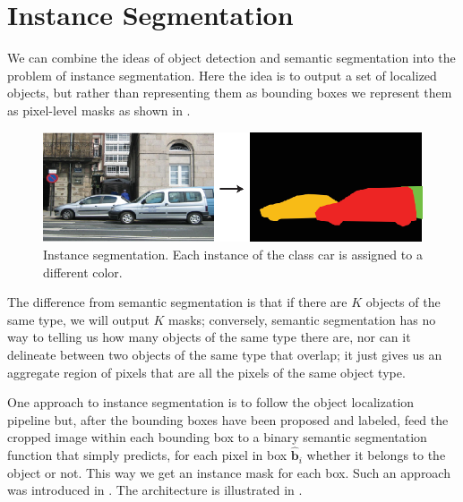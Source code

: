 \section{Instance Segmentation}

We can combine the ideas of object detection and semantic segmentation into the problem of instance segmentation. Here the idea is to output a set of localized objects, but rather than representing them as bounding boxes we represent them as pixel-level masks as shown in \fig{\ref{fig:instance_segmentation}}.


\begin{figure}
    \centerline{
        \includegraphics[width=0.6\linewidth]{figures/object_recognition/instance_segmentation.eps}
    }
    \caption{Instance segmentation. Each instance of the class car is assigned to a different color.}
    \label{fig:instance_segmentation}
\end{figure}

The difference from semantic segmentation is that if there are $K$ objects of the same type, we will output $K$ masks; conversely, semantic segmentation has no way to telling us how many objects of the same type there are, nor can it delineate between two objects of the same type that overlap; it just gives us an aggregate region of pixels that are all the pixels of the same object type.

One approach to instance segmentation is to follow the object localization pipeline but, after the bounding boxes have been proposed and labeled, feed the cropped image within each bounding box to a binary semantic segmentation function that simply predicts, for each pixel in box $\hat{\mathbf{b}}_i$ whether it belongs to the object or not. This way we get an instance mask for each box. Such an approach was introduced in \cite{he2017}. The architecture is illustrated in \fig{\ref{fig:instance_segmentation_architecture}}.

